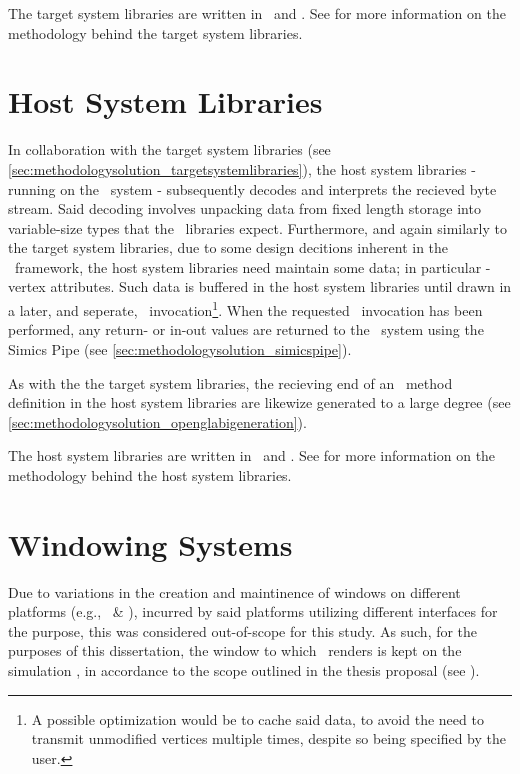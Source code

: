 The target system libraries are written in \dvttermc\ and \dvttermcplusplus .
See  for more information on the methodology behind the target system libraries.

\section{Host System Libraries}
\label{sec:methodologysolution_hostsystemlibraries}
In collaboration with the target system libraries (see \ref{sec:methodologysolution_targetsystemlibraries}), the host system libraries - running on the \dvttermhost\ system - subsequently decodes and interprets the recieved byte stream.
Said decoding involves unpacking data from fixed length storage into variable-size types that the \dvttermopengl\ libraries expect.
Furthermore, and again similarly to the target system libraries, due to some design decitions inherent in the \dvttermopenglestwopointo\ framework, the host system libraries need maintain some data; in particular - vertex attributes.
Such data is buffered in the host system libraries until drawn in a later, and seperate, \dvttermopengl\ invocation\footnote{A possible optimization would be to cache said data, to avoid the need to transmit unmodified vertices multiple times, despite so being specified by the user.}.
When the requested \dvttermopengl\ invocation has been performed, any return- or in-out values are returned to the \dvttermtarget\ system using the Simics Pipe (see \ref{sec:methodologysolution_simicspipe}).

As with the the target system libraries, the recieving end of an \dvttermopengl\ method definition in the host system libraries are likewize generated to a large degree (see \ref{sec:methodologysolution_openglabigeneration}).

The host system libraries are written in \dvttermc\ and \dvttermcplusplus .
See  for more information on the methodology behind the host system libraries.

\section{Windowing Systems}
\label{sec:methodologysolution_windowingsystems}
Due to variations in the creation and maintinence of windows on different platforms (e.g., \dvttermfedora\ \& \dvttermandroid ), incurred by said platforms utilizing different interfaces for the purpose, this was considered out-of-scope for this study.
As such, for the purposes of this dissertation, the window to which \dvttermopengl\ renders is kept on the simulation \dvttermhost , in accordance to the scope outlined in the thesis proposal (see ).

